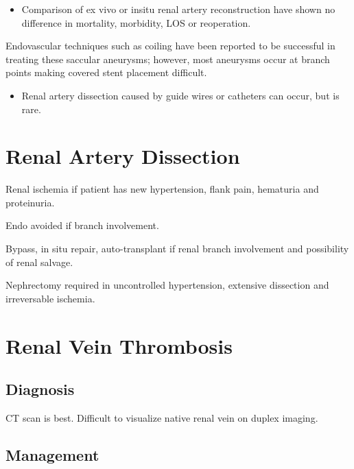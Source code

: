 \documentclass[
]{book}
\providecommand{\tightlist}{%
  \setlength{\itemsep}{0pt}\setlength{\parskip}{0pt}}
\begin{document}
\begin{itemize}
\tightlist
\item
  Comparison of ex vivo or insitu renal artery reconstruction have
  shown no difference in mortality, morbidity, LOS or reoperation.
\end{itemize}

Endovascular techniques such as coiling have been reported to be
successful in treating these saccular aneurysms; however, most aneurysms
occur at branch points making covered stent placement difficult.
\citep{colemanRenalArteryAneurysms2015}

\begin{itemize}
\tightlist
\item
  Renal artery dissection caused by guide wires or catheters can
  occur, but is rare.
\end{itemize}

\hypertarget{renal-artery-dissection}{%
\section{Renal Artery Dissection}\label{renal-artery-dissection}}

Renal ischemia if patient has new hypertension, flank pain, hematuria
and proteinuria. \citep{mullerSurgicalTreatmentRenal2003}

Endo avoided if branch involvement.

Bypass, in situ repair, auto-transplant if renal branch involvement and
possibility of renal salvage.

Nephrectomy required in uncontrolled hypertension, extensive dissection
and irreversable ischemia.

\hypertarget{renal-vein-thrombosis}{%
\section{Renal Vein Thrombosis}\label{renal-vein-thrombosis}}

\hypertarget{diagnosis-1}{%
\subsection{Diagnosis}\label{diagnosis-1}}

CT scan is best. Difficult to visualize native renal vein on duplex
imaging. \citep{asgharRenalVeinThrombosis2007, velazquez-ramirez129RenovascularDisease2019}

\hypertarget{management-7}{%
\subsection{Management}\label{management-7}}
\end{document}
